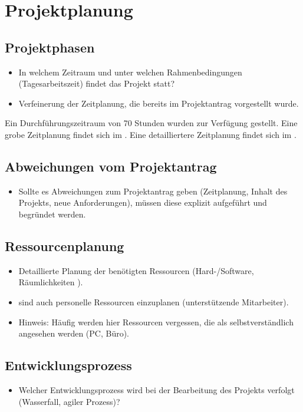 \section{Projektplanung} 
\label{sec:Projektplanung}


\subsection{Projektphasen}
\label{sec:Projektphasen}

\begin{itemize}
	\item In welchem Zeitraum und unter welchen Rahmenbedingungen (\zB Tagesarbeitszeit) findet das Projekt statt?
	\item Verfeinerung der Zeitplanung, die bereits im Projektantrag vorgestellt wurde.
\end{itemize}
Ein Durchführungszeitraum von 70 Stunden wurden zur Verfügung gestellt. Eine grobe Zeitplanung findet sich im . Eine detailliertere Zeitplanung findet sich im .



\subsection{Abweichungen vom Projektantrag}
\label{sec:AbweichungenProjektantrag}

\begin{itemize}
	\item Sollte es Abweichungen zum Projektantrag geben (\zB Zeitplanung, Inhalt des Projekts, neue Anforderungen), müssen diese explizit aufgeführt und begründet werden.
\end{itemize}


\subsection{Ressourcenplanung}
\label{sec:Ressourcenplanung}

\begin{itemize}
	\item Detaillierte Planung der benötigten Ressourcen (Hard-/Software, Räumlichkeiten \usw).
	\item \Ggfs sind auch personelle Ressourcen einzuplanen (\zB unterstützende Mitarbeiter).
	\item Hinweis: Häufig werden hier Ressourcen vergessen, die als selbstverständlich angesehen werden (\zB PC, Büro). 
\end{itemize}


\subsection{Entwicklungsprozess}
\label{sec:Entwicklungsprozess}
\begin{itemize}
	\item Welcher Entwicklungsprozess wird bei der Bearbeitung des Projekts verfolgt (\zB Wasserfall, agiler Prozess)?
\end{itemize}
